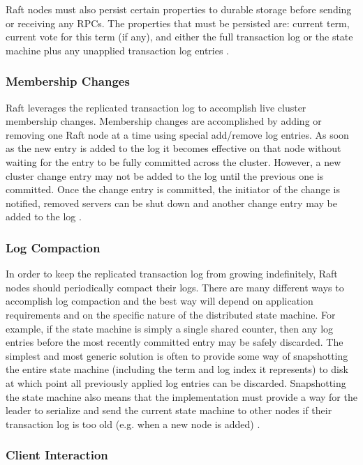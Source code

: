 \documentclass[conference,compsoc]{./IEEEtran/IEEEtran}
\begin{document}
Raft nodes must also persist certain properties to durable storage
before sending or receiving any RPCs. The properties that must be
persisted are: current term, current vote for this term (if any), and
either the full transaction log or the state machine plus any
unapplied transaction log entries
\cite[Section~3.8]{raft_thesis:ongaro14}.

\subsubsection{Membership Changes}

Raft leverages the replicated transaction log to accomplish live
cluster membership changes. Membership changes are accomplished by
adding or removing one Raft node at a time using special add/remove
log entries. As soon as the new entry is added to the log it becomes
effective on that node without waiting for the entry to be fully
committed across the cluster. However, a new cluster change entry may
not be added to the log until the previous one is committed. Once the
change entry is committed, the initiator of the change is notified,
removed servers can be shut down and another change entry may be added
to the log \cite[Section~4]{raft_thesis:ongaro14}.

\subsubsection{Log Compaction}

In order to keep the replicated transaction log from growing
indefinitely, Raft nodes should periodically compact their logs. There
are many different ways to accomplish log compaction and the best way
will depend on application requirements and on the specific nature of
the distributed state machine. For example, if the state machine is
simply a single shared counter, then any log entries before the most
recently committed entry may be safely discarded.
The simplest and most generic solution is often to provide some way of
snapshotting the entire state machine (including the term and log
index it represents) to disk at which point all previously applied log
entries can be discarded. Snapshotting the state machine also means
that the implementation must provide a way for the leader to serialize
and send the current state machine to other nodes if their transaction
log is too old (e.g. when a new node is added)
\cite[Section~5]{raft_thesis:ongaro14}.

\subsubsection{Client Interaction}
\end{document}
